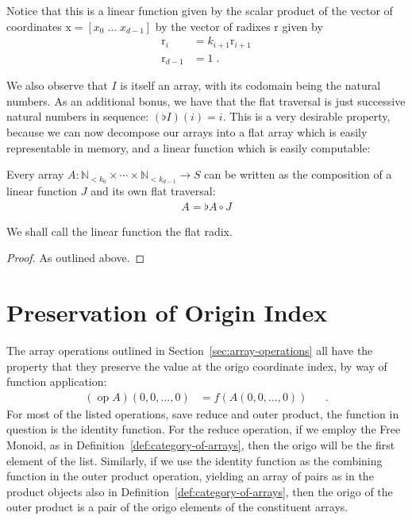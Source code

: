 \documentclass{DIKU-report-variant}
\newcommand\mrm[1]{\mathrm{#1}}
\newcommand\brm[1]{\bm{\mrm{#1}}}
\newcommand\Nat{\mathbb{N}}
\begin{document}
Notice that this is a linear function given by the scalar product of the vector of coordinates
\(\brm x = [x_0\; \dots\; x_{d-1}]\) by the vector of radixes \(\brm r\) given by
\begin{align*}
  \brm r_i &= k_{i+1} \brm r_{i+1} \\
  \brm r_{d-1} &= 1 \;.
\end{align*}

We also observe that \(I\) is itself an array, with its codomain being the natural numbers. As an additional
bonus, we have that the flat traversal is just successive natural numbers in sequence: \((\flat I)(i) = i\).
This is a very desirable property, because we can now decompose our arrays into a flat array which is easily
representable in memory, and a linear function which is easily computable:
\begin{theorem}
  \label{the:linear-decompose}
  Every array \(A : \Nat_{<k_0} \times \cdots \times \Nat_{<k_{d-1}} \to S\) can be written as
  the composition of a linear function \(J\) and its own flat traversal:
  \begin{align*}
    A = \flat A \circ J
  \end{align*}
  
  We shall call the linear function the flat radix.
\end{theorem}
\begin{proof}
  As outlined above.
\end{proof}

\section{Preservation of Origin Index}

The array operations outlined in Section~\ref{sec:array-operations} all have the
property that they preserve the value at the origo coordinate index, by way of function
application:
\begin{align*}
  (\operatorname{op} A)(0, 0,\dots,0) &= f(A(0, 0, \dots, 0)) && .
\end{align*}
For most of the listed operations, save reduce and outer product, the function in question is the
identity function. For the reduce operation, if we employ the Free Monoid, as in
Definition~\ref{def:category-of-arrays}, then the origo will be the first element of the list.
Similarly, if we use the identity function as the combining function in the outer product operation,
yielding an array of pairs as in the product objects also in Definition~\ref{def:category-of-arrays},
then the origo of the outer product is a pair of the origo elements of the constituent arrays.
\end{document}
